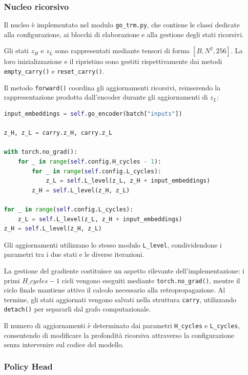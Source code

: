 \subsubsection{Nucleo ricorsivo}

Il nucleo è implementato nel modulo \texttt{go\_trm.py}, che contiene le classi dedicate alla configurazione, ai blocchi di elaborazione e alla gestione degli stati ricorsivi.

Gli stati \(z_H\) e \(z_L\) sono rappresentati mediante tensori di forma \([B,N^2,256]\). La loro inizializzazione e il ripristino sono gestiti rispettivamente dai metodi \texttt{empty\_carry()} e \texttt{reset\_carry()}.

Il metodo \texttt{forward()} coordina gli aggiornamenti ricorsivi, reinserendo la rappresentazione prodotta dall'encoder durante gli aggiornamenti di \(z_L\):

\begin{lstlisting}[language=Python, caption={Aggiornamento ricorsivo degli stati latenti}, label={lst:trm_cycles}]
input_embeddings = self.go_encoder(batch["inputs"])

z_H, z_L = carry.z_H, carry.z_L

with torch.no_grad():
    for _ in range(self.config.H_cycles - 1):
        for _ in range(self.config.L_cycles):
            z_L = self.L_level(z_L, z_H + input_embeddings)
        z_H = self.L_level(z_H, z_L)

for _ in range(self.config.L_cycles):
    z_L = self.L_level(z_L, z_H + input_embeddings)
z_H = self.L_level(z_H, z_L)
\end{lstlisting}

Gli aggiornamenti utilizzano lo stesso modulo \texttt{L\_level}, condividendone i parametri tra i due stati e le diverse iterazioni.

La gestione del gradiente costituisce un aspetto rilevante dell'implementazione: i primi \(H\_cycles-1\) cicli vengono eseguiti mediante \texttt{torch.no\_grad()}, mentre il ciclo finale mantiene attivo il calcolo necessario alla retropropagazione. Al termine, gli stati aggiornati vengono salvati nella struttura \texttt{carry}, utilizzando \texttt{detach()} per separarli dal grafo computazionale.

Il numero di aggiornamenti è determinato dai parametri \texttt{H\_cycles} e \texttt{L\_cycles}, consentendo di modificare la profondità ricorsiva attraverso la configurazione senza intervenire sul codice del modello.

\subsubsection{Policy Head}

